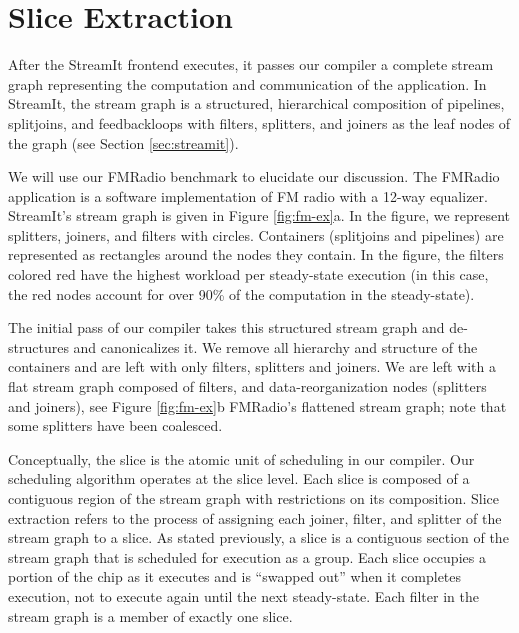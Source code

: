 \section{Slice Extraction}

\begin{figure*}
\centering
{}
\caption{FMRadio with a 12-way equalizer after the passes of the
SpaceTime Compiler.
\protect\label{fig:fm-ex}}
\end{figure*}

\label{sec:extract}
After the StreamIt frontend executes, it passes our compiler a
complete stream graph representing the computation and communication
of the application.  In StreamIt, the stream graph is a structured,
hierarchical composition of pipelines, splitjoins, and feedbackloops
with filters, splitters, and joiners as the leaf nodes of the graph
(see Section \ref{sec:streamit}).

We will use our FMRadio benchmark to elucidate our discussion.  The
FMRadio application is a software implementation of FM radio with a
12-way equalizer.  StreamIt's stream graph is given in Figure
\ref{fig:fm-ex}a.  In the figure, we represent splitters, joiners, and
filters with circles.  Containers (splitjoins and pipelines) are
represented as rectangles around the nodes they contain.  In the
figure, the filters colored red have the highest workload per
steady-state execution (in this case, the red nodes account for over
90\% of the computation in the steady-state).

The initial pass of our compiler takes this structured stream graph
and de-structures and canonicalizes it.  We remove all hierarchy and
structure of the containers and are left with only filters, splitters
and joiners. We are left with a flat stream graph composed of filters,
and data-reorganization nodes (splitters and joiners), see Figure
\ref{fig:fm-ex}b FMRadio's flattened stream graph; note that some
splitters have been coalesced.

Conceptually, the slice is the atomic unit of scheduling in our
compiler.  Our scheduling algorithm operates at the slice level.  Each
slice is composed of a contiguous region of the stream graph with
restrictions on its composition.  Slice extraction refers to the
process of assigning each joiner, filter, and splitter of the stream
graph to a slice.  As stated previously, a slice is a contiguous
section of the stream graph that is scheduled for execution as a
group. Each slice occupies a portion of the chip as it executes and is
``swapped out'' when it completes execution, not to execute again
until the next steady-state.  Each filter in the stream graph is a
member of exactly one slice.

